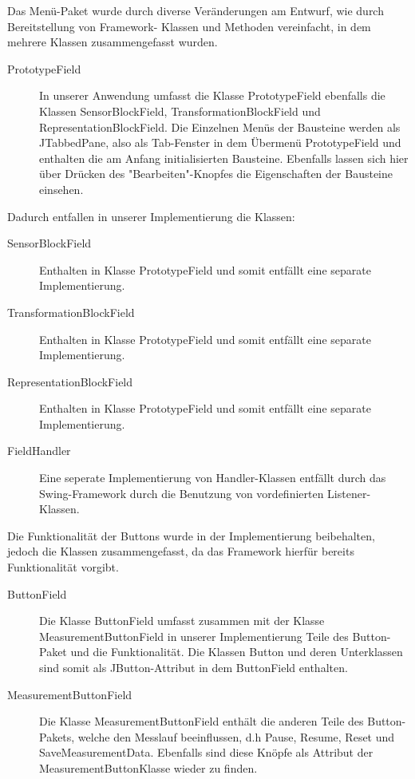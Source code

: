 \documentclass[parskip=full]{scrartcl}
\begin{document}
Das Menü-Paket wurde durch diverse Veränderungen am Entwurf, wie durch Bereitstellung von Framework- Klassen und Methoden vereinfacht, in dem mehrere Klassen zusammengefasst wurden.

\begin{description}
\item[PrototypeField] In unserer Anwendung umfasst die Klasse PrototypeField ebenfalls die Klassen SensorBlockField, TransformationBlockField und RepresentationBlockField. Die Einzelnen Menüs der Bausteine werden als JTabbedPane, also als Tab-Fenster in dem Übermenü PrototypeField und enthalten die am Anfang initialisierten Bausteine. Ebenfalls lassen sich hier über Drücken des "Bearbeiten"-Knopfes die Eigenschaften der Bausteine einsehen. 
\end{description}

Dadurch entfallen in unserer Implementierung die Klassen:

\begin{description}
\item[SensorBlockField] Enthalten in Klasse PrototypeField und somit entfällt eine separate Implementierung.
\item[TransformationBlockField] Enthalten in Klasse PrototypeField und somit entfällt eine separate Implementierung.
\item[RepresentationBlockField] Enthalten in Klasse PrototypeField und somit entfällt eine separate Implementierung.
\item[FieldHandler] Eine seperate Implementierung von Handler-Klassen entfällt durch das Swing-Framework durch die Benutzung von vordefinierten Listener-Klassen.
\end{description}

Die Funktionalität der Buttons wurde in der Implementierung beibehalten, jedoch die Klassen zusammengefasst, da das Framework hierfür bereits Funktionalität vorgibt.

\begin{description}
\item[ButtonField] Die Klasse ButtonField umfasst zusammen mit der Klasse MeasurementButtonField in unserer Implementierung Teile des Button-Paket und die Funktionalität. Die Klassen Button und deren Unterklassen sind somit als
JButton-Attribut in dem ButtonField enthalten. 
\item[MeasurementButtonField] Die Klasse MeasurementButtonField enthält die anderen Teile des Button-Pakets, welche den Messlauf beeinflussen, d.h Pause, Resume, Reset und SaveMeasurementData. Ebenfalls sind diese Knöpfe als Attribut der MeasurementButtonKlasse wieder zu finden.
\end{description}
\end{document}
